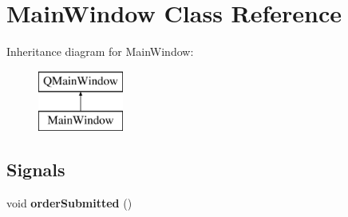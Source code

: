 \hypertarget{class_main_window}{}\section{Main\+Window Class Reference}
\label{class_main_window}
Inheritance diagram for Main\+Window\+:\begin{figure}[H]
\begin{center}
\leavevmode
\includegraphics[height=2.000000cm]{class_main_window}
\end{center}
\end{figure}
\subsection*{Signals}
\begin{DoxyCompactItemize}
\item 
void {\bfseries order\+Submitted} ()\hypertarget{class_main_window_a0bf3c8978269c0dc28ad5c86e1364702}{}\label{class_main_window_a0bf3c8978269c0dc28ad5c86e1364702}

\end{DoxyCompactItemize}
